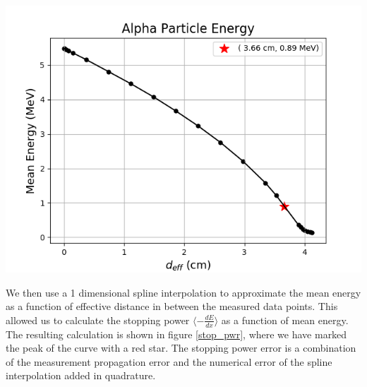\documentclass[10pt]{article}
\newenvironment{Figure}
{\par\medskip\noindent\minipage{\linewidth}}
{\endminipage\par\medskip}
\begin{document}
\begin{multicols}{2}
\begin{Figure}
	\includegraphics[width=\textwidth,keepaspectratio]{alph_energy.png}
\end{Figure} 

We then use a 1 dimensional spline interpolation to approximate the mean energy as a function of effective distance in between the measured data points. This allowed us to calculate the stopping power $\langle - \frac{dE}{dx} \rangle$ as a function of mean energy. The resulting calculation is shown in figure \ref{stop_pwr}, where we have marked the peak of the curve with a red star.  The stopping power error is a combination of the measurement propagation error and the numerical error of the spline interpolation added in quadrature. 


\end{multicols}
\end{document}
